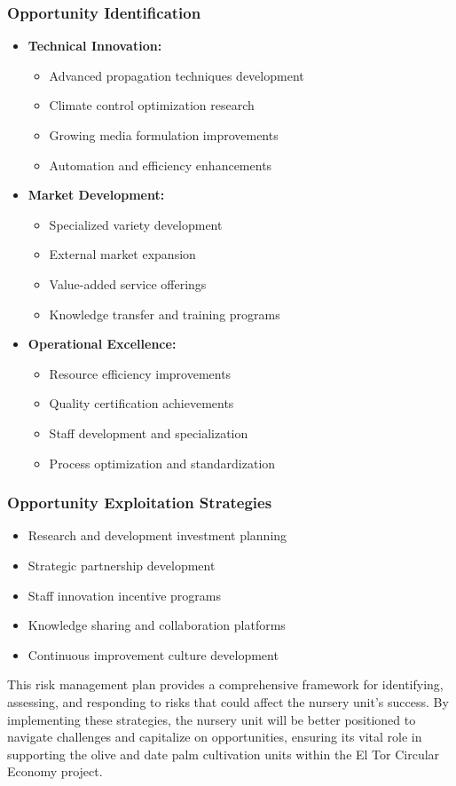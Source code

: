 \subsubsection{Opportunity Identification}
\begin{itemize}
    \item \textbf{Technical Innovation:}
    \begin{itemize}
        \item Advanced propagation techniques development
        \item Climate control optimization research
        \item Growing media formulation improvements
        \item Automation and efficiency enhancements
    \end{itemize}
    
    \item \textbf{Market Development:}
    \begin{itemize}
        \item Specialized variety development
        \item External market expansion
        \item Value-added service offerings
        \item Knowledge transfer and training programs
    \end{itemize}
    
    \item \textbf{Operational Excellence:}
    \begin{itemize}
        \item Resource efficiency improvements
        \item Quality certification achievements
        \item Staff development and specialization
        \item Process optimization and standardization
    \end{itemize}
\end{itemize}

\subsubsection{Opportunity Exploitation Strategies}
\begin{itemize}
    \item Research and development investment planning
    \item Strategic partnership development
    \item Staff innovation incentive programs
    \item Knowledge sharing and collaboration platforms
    \item Continuous improvement culture development
\end{itemize}

This risk management plan provides a comprehensive framework for identifying, assessing, and responding to risks that could affect the nursery unit's success. By implementing these strategies, the nursery unit will be better positioned to navigate challenges and capitalize on opportunities, ensuring its vital role in supporting the olive and date palm cultivation units within the El Tor Circular Economy project. 